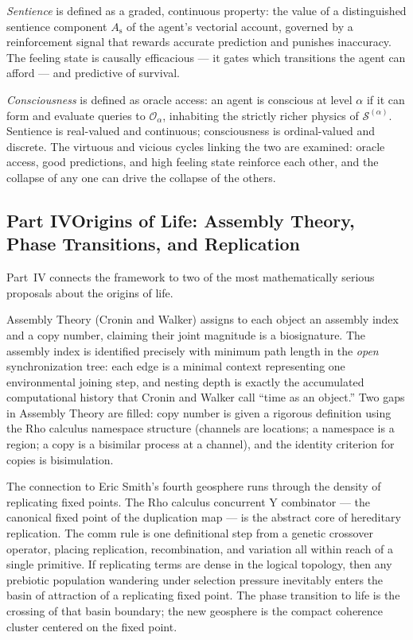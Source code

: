 \documentclass[12pt,openright,twoside]{book}
\theoremstyle{remark}
\newcommand{\GSLT}{\mathcal{S}}
\newcommand{\sent}{A_{\mathrm{s}}}
\newcommand{\oracle}{\mathcal{O}}
\newcommand{\fiber}[1]{\GSLT^{(#1)}}
\begin{document}
\emph{Sentience} is defined as a graded, continuous property: the
value of a distinguished sentience component $\sent$ of the
agent's vectorial account, governed by a reinforcement signal
that rewards accurate prediction and punishes inaccuracy.
The feeling state is causally efficacious --- it gates which
transitions the agent can afford --- and predictive of survival.

\emph{Consciousness} is defined as oracle access: an agent is
conscious at level $\alpha$ if it can form and evaluate queries
to $\oracle_\alpha$, inhabiting the strictly richer physics of
$\fiber{\alpha}$.
Sentience is real-valued and continuous; consciousness is
ordinal-valued and discrete.
The virtuous and vicious cycles linking the two are examined:
oracle access, good predictions, and high feeling state reinforce
each other, and the collapse of any one can drive the collapse
of the others.

\bigskip

\subsection*{Part IV\quad Origins of Life: Assembly Theory,
Phase Transitions, and Replication}

Part~IV connects the framework to two of the most mathematically
serious proposals about the origins of life.

Assembly Theory (Cronin and Walker) assigns to each object an
assembly index and a copy number, claiming their joint magnitude
is a biosignature.
The assembly index is identified precisely with minimum path length
in the \emph{open} synchronization tree: each edge is a minimal
context representing one environmental joining step, and nesting
depth is exactly the accumulated computational history that
Cronin and Walker call ``time as an object.''
Two gaps in Assembly Theory are filled: copy number is given a
rigorous definition using the Rho calculus namespace structure
(channels are locations; a namespace is a region; a copy is a
bisimilar process at a channel), and the identity criterion for
copies is bisimulation.

The connection to Eric Smith's fourth geosphere runs through the
density of replicating fixed points.
The Rho calculus concurrent Y combinator --- the canonical fixed
point of the duplication map --- is the abstract core of hereditary
replication.
The comm rule is one definitional step from a genetic crossover
operator, placing replication, recombination, and variation all
within reach of a single primitive.
If replicating terms are dense in the logical topology, then any
prebiotic population wandering under selection pressure inevitably
enters the basin of attraction of a replicating fixed point.
The phase transition to life is the crossing of that basin
boundary; the new geosphere is the compact coherence cluster
centered on the fixed point.
\end{document}
